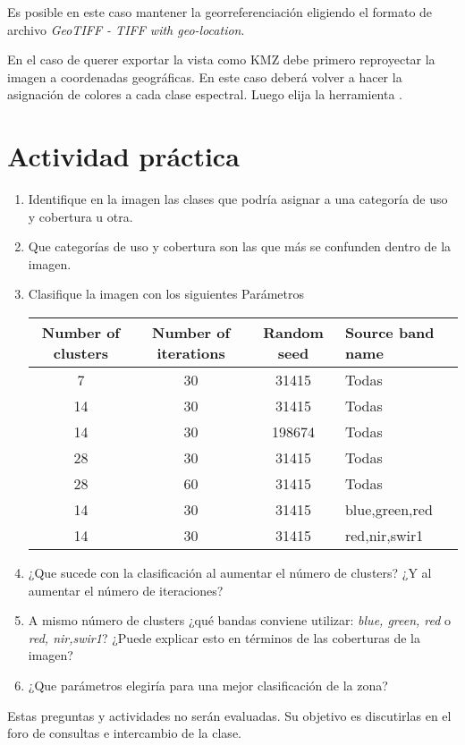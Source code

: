 Es posible en este caso mantener la georreferenciación eligiendo el formato de archivo \emph{GeoTIFF - TIFF with geo-location}.

En el caso de querer exportar la vista como KMZ debe primero reproyectar la imagen a coordenadas geográficas. En este caso deberá volver a hacer la asignación de colores a cada clase espectral. Luego elija la herramienta .


\section{Actividad práctica}

\begin{enumerate}
  \item Identifique en la imagen las clases que podría asignar a una categoría de uso y cobertura u otra.
  \item Que categorías de uso y cobertura son las que más se confunden dentro de la imagen.
  \item Clasifique la imagen con los siguientes Parámetros
  \begin{table}[h]
  \centering
  \begin{tabular}{cccl}
  \toprule
  Number of clusters & Number of iterations & Random seed & Source band name \\ \midrule
  7                  & 30                   & 31415       & Todas            \\
  14                 & 30                   & 31415       & Todas            \\
  14                 & 30                   & 198674      & Todas            \\
  28                 & 30                   & 31415       & Todas            \\
  28                 & 60                   & 31415       & Todas            \\
  14                 & 30                   & 31415       & blue,green,red   \\
  14                 & 30                   & 31415       & red,nir,swir1    \\ \bottomrule
  \end{tabular}
  \end{table}
  \item ¿Que sucede con la clasificación al aumentar el número de clusters? ¿Y al aumentar el número de iteraciones?
  \item A mismo número de clusters ¿qué bandas conviene utilizar: \emph{blue, green, red} o \emph{red, nir,swir1}? ¿Puede explicar esto en términos de las coberturas de la imagen?
  \item ¿Que parámetros elegiría para una mejor clasificación de la zona?
\end{enumerate}

Estas preguntas y actividades no serán evaluadas. Su objetivo es discutirlas en el foro de consultas e intercambio de la clase.
